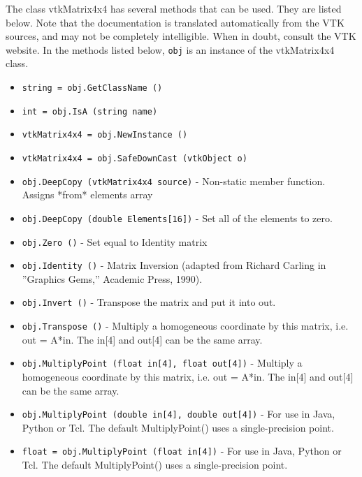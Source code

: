 The class vtkMatrix4x4 has several methods that can be used.
  They are listed below.
Note that the documentation is translated automatically from the VTK sources,
and may not be completely intelligible.  When in doubt, consult the VTK website.
In the methods listed below, \verb|obj| is an instance of the vtkMatrix4x4 class.
\begin{itemize}
\item  \verb|string = obj.GetClassName ()|

\item  \verb|int = obj.IsA (string name)|

\item  \verb|vtkMatrix4x4 = obj.NewInstance ()|

\item  \verb|vtkMatrix4x4 = obj.SafeDownCast (vtkObject o)|

\item  \verb|obj.DeepCopy (vtkMatrix4x4 source)| -  Non-static member function. Assigns *from* elements array

\item  \verb|obj.DeepCopy (double Elements[16])| -  Set all of the elements to zero.

\item  \verb|obj.Zero ()| -  Set equal to Identity matrix

\item  \verb|obj.Identity ()| -  Matrix Inversion (adapted from Richard Carling in ''Graphics Gems,'' 
 Academic Press, 1990).

\item  \verb|obj.Invert ()| -  Transpose the matrix and put it into out. 

\item  \verb|obj.Transpose ()| -  Multiply a homogeneous coordinate by this matrix, i.e. out = A*in.
 The in[4] and out[4] can be the same array.

\item  \verb|obj.MultiplyPoint (float in[4], float out[4])| -  Multiply a homogeneous coordinate by this matrix, i.e. out = A*in.
 The in[4] and out[4] can be the same array.

\item  \verb|obj.MultiplyPoint (double in[4], double out[4])| -  For use in Java, Python or Tcl.  The default MultiplyPoint() uses
 a single-precision point.

\item  \verb|float = obj.MultiplyPoint (float in[4])| -  For use in Java, Python or Tcl.  The default MultiplyPoint() uses
 a single-precision point.


\end{itemize}
